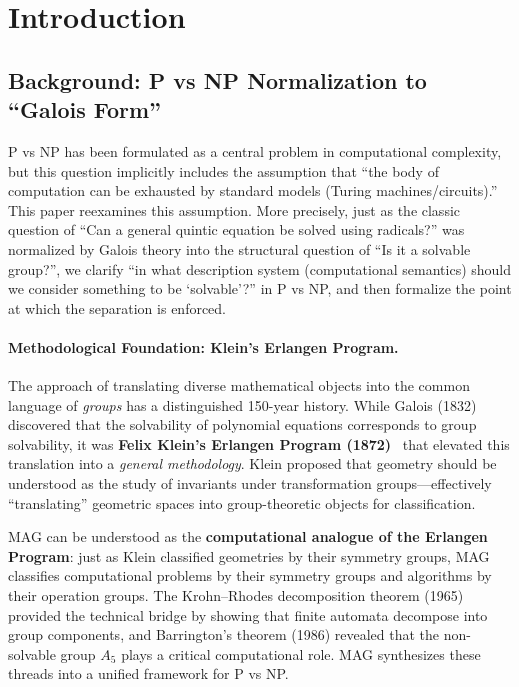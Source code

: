 \documentclass[11pt,a4paper]{article}
\theoremstyle{plain}
\theoremstyle{definition}
\newcommand{\Aalt}{A_5}
\begin{document}
\section{Introduction}

\subsection{Background: P vs NP Normalization to ``Galois Form''}

P vs NP has been formulated as a central problem in computational complexity, but this question implicitly includes the assumption that ``the body of computation can be exhausted by standard models (Turing machines/circuits).'' This paper reexamines this assumption. More precisely, just as the classic question of ``Can a general quintic equation be solved using radicals?'' was normalized by Galois theory into the structural question of ``Is it a solvable group?'', we clarify ``in what description system (computational semantics) should we consider something to be `solvable'?'' in P vs NP, and then formalize the point at which the separation is enforced.


\paragraph{Methodological Foundation: Klein's Erlangen Program.}
The approach of translating diverse mathematical objects into the common language of \emph{groups} has a distinguished 150-year history. While Galois (1832) discovered that the solvability of polynomial equations corresponds to group solvability, it was \textbf{Felix Klein's Erlangen Program (1872)}~\cite{klein1872} that elevated this translation into a \emph{general methodology}. Klein proposed that geometry should be understood as the study of invariants under transformation groups---effectively ``translating'' geometric spaces into group-theoretic objects for classification.

MAG can be understood as the \textbf{computational analogue of the Erlangen Program}: just as Klein classified geometries by their symmetry groups, MAG classifies computational problems by their symmetry groups and algorithms by their operation groups. The Krohn--Rhodes decomposition theorem (1965) provided the technical bridge by showing that finite automata decompose into group components, and Barrington's theorem (1986) revealed that the non-solvable group $\Aalt$ plays a critical computational role. MAG synthesizes these threads into a unified framework for P vs NP.
\end{document}
